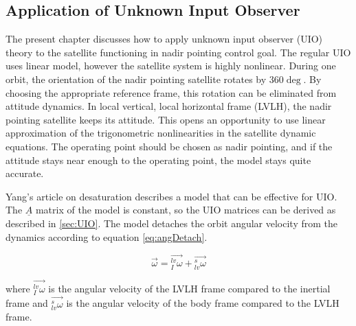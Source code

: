 \subsection{Application of Unknown Input Observer}
\label{sec:UIO_App}


The present chapter discusses how to apply unknown input observer (UIO) theory to the satellite functioning in nadir pointing control goal. The regular UIO uses linear model, however the satellite system is highly nonlinear.  During one orbit, the orientation of the nadir pointing satellite rotates by $360\deg$. By choosing the appropriate reference frame, this rotation can be eliminated from attitude dynamics. In local vertical, local horizontal frame (LVLH), the nadir pointing satellite keeps its attitude. This opens an opportunity to use linear approximation of the trigonometric nonlinearities in the satellite dynamic equations. The operating point should be chosen as nadir pointing, and if the attitude stays near enough to the operating point, the model stays quite accurate.


Yang's article on desaturation \cite{DesatYang} describes a model that can be effective for UIO. The $\underline{A}$ matrix of the model is constant, so the UIO matrices can be derived as described in \ref{sec:UIO}. The model detaches the orbit angular velocity from the dynamics according to equation \ref{eq:angDetach}.

\begin{equation}
\label{eq:angDetach}
\vec{\omega} = \vec{_I^{lv}\omega} + \vec{_{lv}^s\omega}
\end{equation}

where $\vec{_I^{lv}\omega}$ is the angular velocity of the LVLH frame compared to the inertial frame and $\vec{_{lv}^s\omega}$ is the angular velocity of the body frame compared to the LVLH frame.



